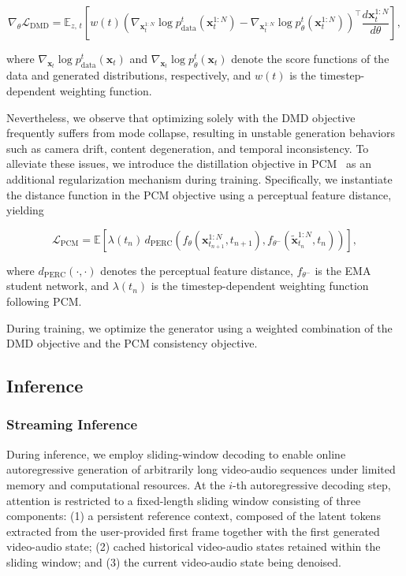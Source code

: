 \begin{equation}
\nabla_{\theta}\mathcal{L}_{\mathrm{DMD}}
=
\mathbb{E}_{z,\,t}
\left[
w(t)
\left(
\nabla_{{\bm{x}}^{1:N}_{t}}
\log p_{\mathrm{data}}^{t}({\bm{x}}^{1:N}_{t})
-
\nabla_{{\bm{x}}^{1:N}_{t}}
\log p_{\theta}^{t}({\bm{x}}^{1:N}_{t})
\right)^{\!\top}
\frac{d {\bm{x}}^{1:N}_{t}}
{d\theta}
\right],
\end{equation}


where $\nabla_{{\bm{x}}_{t}}\log p_{\mathrm{data}}^{t}({\bm{x}}_{t})$
and
$\nabla_{{\bm{x}}_{t}}\log p_{\theta}^{t}({\bm{x}}_{t})$
denote the score functions of the data and generated distributions, respectively, and
$w(t)$ is the timestep-dependent weighting function.

Nevertheless, we observe that optimizing solely with the DMD objective frequently suffers from mode collapse, resulting in unstable generation behaviors such as camera drift, content degeneration, and temporal inconsistency.
To alleviate these issues, we introduce the distillation objective in PCM~\cite{wang2024phased} as an additional regularization mechanism during training. Specifically, we instantiate the distance function in the PCM objective using a perceptual feature distance, yielding

\begin{equation}
\mathcal{L}_{\mathrm{PCM}}
=
\mathbb{E}
\left[
\lambda(t_n)\,
d_{\mathrm{PERC}}
\!\left(
f_{\theta}({\bm{x}}^{1:N}_{t_{n+1}},t_{n+1}),
f_{\theta^-}(\tilde{{\bm{x}}}_{t_n}^{1:N},t_n)
\right)
\right],
\end{equation}

where $d_{\mathrm{PERC}}(\cdot,\cdot)$ denotes the perceptual feature distance, $f_{\theta^-}$ is the EMA student network, and $\lambda(t_n)$ is the timestep-dependent weighting function following PCM.

During training, we optimize the generator using a weighted combination of the DMD objective and the PCM consistency objective.


\subsection{Inference}

\subsubsection{Streaming Inference}
During inference, we employ sliding-window decoding to enable online autoregressive generation of arbitrarily long video-audio sequences under limited memory and computational resources. At the $i$-th autoregressive decoding step, attention is restricted to a fixed-length sliding window consisting of three components: (1) a persistent reference context, composed of the latent tokens extracted from the user-provided first frame together with the first generated video-audio state; (2) cached historical video-audio states retained within the sliding window; and (3) the current video-audio state being denoised.


